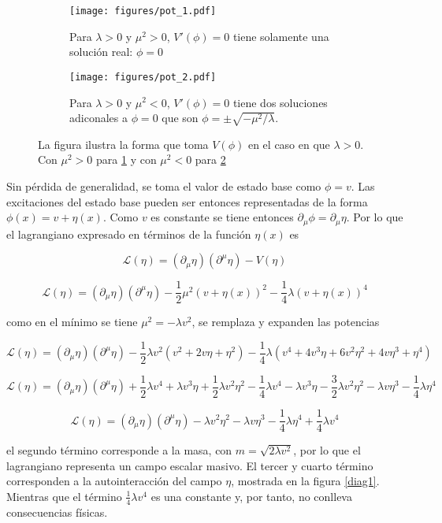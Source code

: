 \begin{figure}[!h]
    \centering
    \begin{subfigure}[b]{0.45\textwidth}
        \centering
        \texttt{[image: figures/pot\_1.pdf]}
        \caption{Para $\lambda > 0$ y $\mu^2>0$, $V'(\phi)=0$ tiene solamente una solución real: $\phi=0$}
        \label{pot1}
    \end{subfigure}
    \hfill
    \begin{subfigure}[b]{0.45\textwidth}
        \centering
        \texttt{[image: figures/pot\_2.pdf]}
        \caption{Para  $\lambda > 0$ y $\mu^2<0$, $V'(\phi)=0$ tiene dos soluciones adiconales a $\phi=0$ que son $\phi = \pm\sqrt{-\mu^2/\lambda}$. }
        \label{pot2}
    \end{subfigure}
    \caption{La figura ilustra la forma que toma $V(\phi)$ en el caso en que $\lambda>0$. Con $\mu^2>0$ para \ref{pot1} y con $\mu^2<0$ para \ref{pot2} }
    \label{pot}
\end{figure}

Sin pérdida de generalidad, se toma el valor de estado base como $\phi=v$. Las excitaciones del estado base pueden ser entonces representadas de la forma $\phi(x) = v+\eta(x)$. Como $v$ es constante se tiene entonces $\partial_{\mu}\phi = \partial_{\mu}\eta$. Por lo que el lagrangiano expresado en términos de la función $\eta(x)$ es

$$\mathcal{L}(\eta) = (\partial_{\mu}\eta)(\partial^{\mu}\eta) -V(\eta)$$

$$\mathcal{L}(\eta) = (\partial_{\mu}\eta)(\partial^{\mu}\eta) - \frac{1}{2}\mu^2(v+\eta(x))^2 - \frac{1}{4}\lambda(v+\eta(x))^4$$

como en el mínimo se tiene $\mu^2=-\lambda v^2$, se remplaza y expanden las potencias

$$\mathcal{L}(\eta) = (\partial_{\mu}\eta)(\partial^{\mu}\eta) - \frac{1}{2}\lambda v^2(v^2 + 2v\eta + \eta^2) - \frac{1}{4}\lambda(v^4+4v^3\eta+6v^2\eta^2+4v\eta^3+\eta^4)$$

$$\mathcal{L}(\eta) = (\partial_{\mu}\eta)(\partial^{\mu}\eta) + \frac{1}{2}\lambda v^4 + \lambda v^3\eta + \frac{1}{2}\lambda v^2\eta^2 - \frac{1}{4}\lambda v^4-\lambda v^3\eta-\frac{3}{2}\lambda v^2\eta^2-\lambda v\eta^3-\frac{1}{4}\lambda\eta^4$$

$$\mathcal{L}(\eta) = (\partial_{\mu}\eta)(\partial^{\mu}\eta)   -\lambda v^2\eta^2-\lambda v\eta^3-\frac{1}{4}\lambda\eta^4+ \frac{1}{4}\lambda v^4$$

el segundo término corresponde a la masa, con $m=\sqrt{2\lambda v^2}$, por lo que el lagrangiano representa un campo escalar masivo. El tercer y cuarto término corresponden a la autointeracción del campo $\eta$, mostrada en la figura \ref{diag1}. Mientras que el término $\frac{1}{4}\lambda v^4$ es una constante y, por tanto, no conlleva consecuencias físicas.

